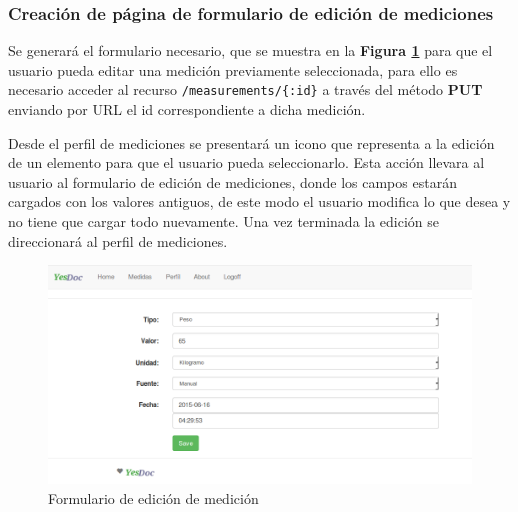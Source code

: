 \subsubsection{Creación de página de formulario de edición de mediciones}
Se generará el formulario necesario, que se muestra en la \textbf{Figura \ref{editar_medicion}} para que el usuario pueda editar una medición previamente seleccionada, para ello es necesario acceder al recurso \texttt{/measurements/\{:id\}} a través del método \textbf{PUT} enviando por URL el id correspondiente a dicha medición. 

Desde el perfil de mediciones se presentará un icono que representa a la edición de un elemento para que el usuario pueda seleccionarlo. Esta acción llevara al usuario al formulario de edición de mediciones, donde los campos estarán cargados con los valores antiguos, de este modo el usuario modifica lo que desea y no tiene que cargar todo nuevamente. Una vez terminada la edición se direccionará al perfil de mediciones.

	\begin{figure}[h]
        \centering
        \includegraphics[width=1\textwidth]{img/2-editar_medicion}
        \caption{Formulario de edición de medición}
		\label{editar_medicion}
    \end{figure}
    

